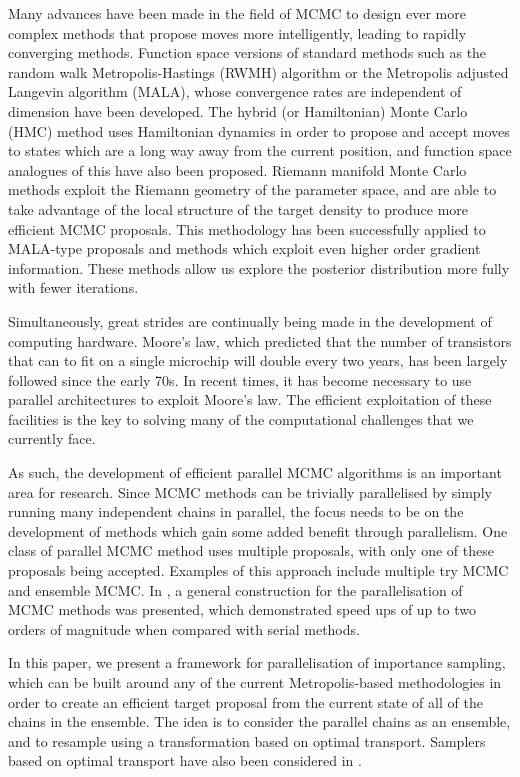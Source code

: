 \documentclass[final]{siamltex}
\begin{document}
Many advances have been made in the field of MCMC to design ever more
complex methods that propose moves more intelligently, leading to
rapidly converging methods. Function space versions of standard methods
such as the random walk Metropolis-Hastings (RWMH) algorithm or the
Metropolis adjusted Langevin algorithm (MALA), whose convergence rates
are independent of dimension have been
developed\cite{cotter2013mcmc}. The hybrid (or Hamiltonian) Monte
Carlo (HMC) method uses Hamiltonian dynamics in order to propose and
accept moves to states which are a long way away from the current
position\cite{sexton1992hamiltonian}, and function space analogues of
this have also been proposed\cite{beskos2011hybrid}. Riemann
manifold Monte Carlo methods exploit the Riemann geometry of the
parameter space, and are able to take advantage of the local structure
of the target density to produce more efficient MCMC
proposals\cite{girolami2011riemann}. This methodology has been
successfully applied to MALA-type proposals and methods which exploit
even higher order gradient information\cite{bui2014solving}.  These
methods allow us explore the posterior distribution more fully 
with fewer iterations.

Simultaneously, great strides are continually being made in the
development of computing hardware. Moore's law, which predicted that
the number of transistors that can to fit on a single microchip will
double every two years, has been largely followed since the early
70s\cite{moore1998cramming}. In recent times, it has become necessary
to use parallel architectures to exploit Moore's law. The efficient
exploitation of these facilities is the key to solving many of the
computational challenges that we currently face.

As such, the development of efficient parallel MCMC algorithms is an
important area for research. Since MCMC methods can be trivially
parallelised by simply running many independent chains in parallel,
the focus needs to be on the development of methods which gain some
added benefit through parallelism. One class of parallel MCMC method
uses multiple proposals, with only one of these proposals being
accepted. Examples of this approach include multiple try
MCMC\cite{liu2000multiple} and ensemble MCMC\cite{neal2011mcmc}. In
\cite{calderhead2014general}, a general construction for the
parallelisation of MCMC methods was presented, which demonstrated
speed ups of up to two orders of magnitude when compared with serial methods.

In this paper, we present a framework for parallelisation of
importance sampling, which can be built around any of the current
Metropolis-based methodologies in order to create an efficient target
proposal from the current state of all of the chains in the
ensemble. The idea is to consider the parallel chains as an ensemble,
and to resample using a transformation based on optimal transport.
Samplers based on optimal transport have also been considered in
\cite{el2012bayesian}.
\end{document}
